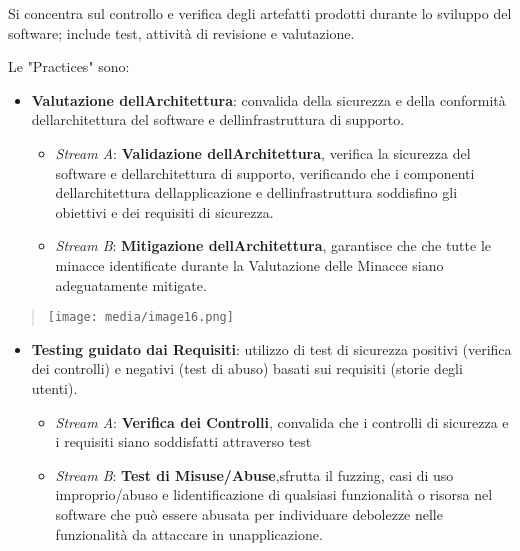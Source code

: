 Si concentra sul controllo e verifica degli artefatti prodotti durante
lo sviluppo del software; include test, attività di revisione e
valutazione.

Le "Practices" sono:

\begin{itemize}
\item
  \textbf{Valutazione dell\textquotesingle Architettura}: convalida
  della sicurezza e della conformità dell\textquotesingle architettura
  del software e dell\textquotesingle infrastruttura di supporto.

  \begin{itemize}
  \item
    \emph{Stream A}: \textbf{Validazione
    dell\textquotesingle Architettura}, verifica la sicurezza del
    software e dell\textquotesingle architettura di supporto,
    verificando che i componenti dell\textquotesingle architettura
    dell\textquotesingle applicazione e
    dell\textquotesingle infrastruttura soddisfino gli obiettivi e dei
    requisiti di sicurezza.
  \item
    \emph{Stream B}: \textbf{Mitigazione
    dell\textquotesingle Architettura}, garantisce che che tutte le
    minacce identificate durante la Valutazione delle Minacce siano
    adeguatamente mitigate.
  \end{itemize}
\end{itemize}

\begin{quote}
\texttt{[image: media/image16.png]}
\end{quote}

\begin{itemize}
\item
  \textbf{Testing guidato dai Requisiti}: utilizzo di test di sicurezza
  positivi (verifica dei controlli) e negativi (test di abuso) basati
  sui requisiti (storie degli utenti).

  \begin{itemize}
  \item
    \emph{Stream A}: \textbf{Verifica dei Controlli}, convalida che i
    controlli di sicurezza e i requisiti siano soddisfatti attraverso
    test
  \item
    \emph{Stream B}: \textbf{Test di Misuse/Abuse},sfrutta il fuzzing,
    casi di uso improprio/abuso e l\textquotesingle identificazione di
    qualsiasi funzionalità o risorsa nel software che può essere abusata
    per individuare debolezze nelle funzionalità da attaccare in
    un\textquotesingle applicazione.
  \end{itemize}
\end{itemize}

